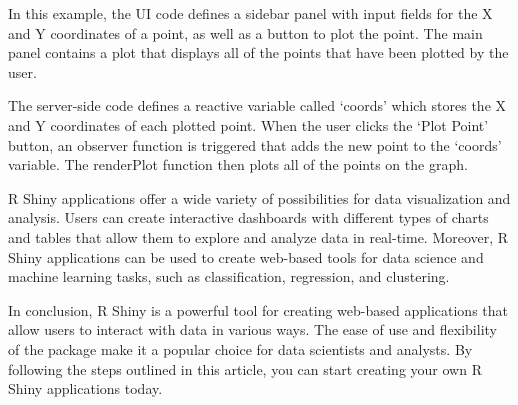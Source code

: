 \documentclass[
]{book}
\begin{document}
In this example, the UI code defines a sidebar panel with input fields for the X and Y coordinates of a point, as well as a button to plot the point. The main panel contains a plot that displays all of the points that have been plotted by the user.

The server-side code defines a reactive variable called `coords' which stores the X and Y coordinates of each plotted point. When the user clicks the `Plot Point' button, an observer function is triggered that adds the new point to the `coords' variable. The renderPlot function then plots all of the points on the graph.

R Shiny applications offer a wide variety of possibilities for data visualization and analysis. Users can create interactive dashboards with different types of charts and tables that allow them to explore and analyze data in real-time. Moreover, R Shiny applications can be used to create web-based tools for data science and machine learning tasks, such as classification, regression, and clustering.

In conclusion, R Shiny is a powerful tool for creating web-based applications that allow users to interact with data in various ways. The ease of use and flexibility of the package make it a popular choice for data scientists and analysts. By following the steps outlined in this article, you can start creating your own R Shiny applications today.
\end{document}
